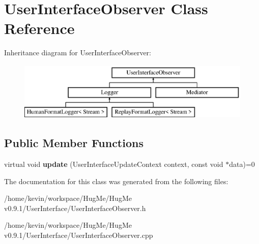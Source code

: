 \hypertarget{classUserInterfaceObserver}{
\section{UserInterfaceObserver Class Reference}
\label{classUserInterfaceObserver}
}
Inheritance diagram for UserInterfaceObserver:\begin{figure}[H]
\begin{center}
\leavevmode
\includegraphics[height=2.78607cm]{classUserInterfaceObserver}
\end{center}
\end{figure}
\subsection*{Public Member Functions}
\begin{DoxyCompactItemize}
\item 
\hypertarget{classUserInterfaceObserver_a99599901a3ae957ef5ae487105d35318}{
virtual void {\bfseries update} (UserInterfaceUpdateContext context, const void $\ast$data)=0}
\label{classUserInterfaceObserver_a99599901a3ae957ef5ae487105d35318}

\end{DoxyCompactItemize}


The documentation for this class was generated from the following files:\begin{DoxyCompactItemize}
\item 
/home/kevin/workspace/HugMe/HugMe v0.9.1/UserInterface/UserInterfaceObserver.h\item 
/home/kevin/workspace/HugMe/HugMe v0.9.1/UserInterface/UserInterfaceObserver.cpp\end{DoxyCompactItemize}
